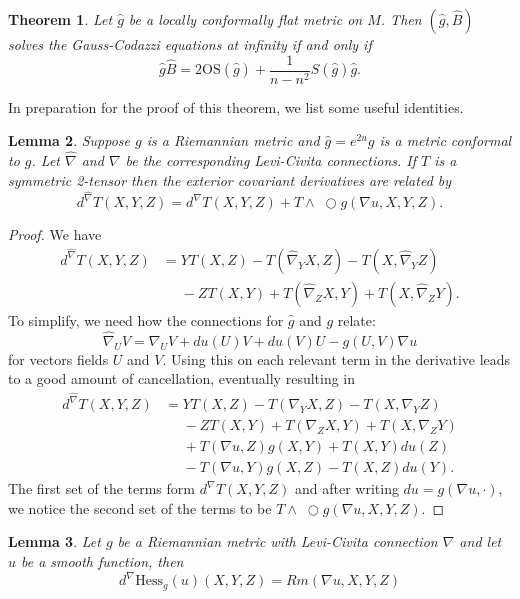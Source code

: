 \documentclass{amsart}
\newcommand{\wtimes}{\wedge \!\!\!\!\!\!\!\!\;\bigcirc}
\newtheorem{thm}{Theorem}[section]
\newtheorem{lem}[thm]{Lemma}
\begin{document}
\begin{thm}
\label{MainThm}
Let $\hat{g}$ be a locally conformally flat metric on $M$. Then $(\hat{g},\hat{B})$ solves the Gauss-Codazzi equations at infinity if and only if 
\[
\hat{g} \hat{B} = 2\mathrm{OS}(\hat{g}) + \frac{1}{n-n^2}S(\hat{g})\hat{g}.
\]
\end{thm}

In preparation for the proof of this theorem, we list some useful identities. 

\begin{lem}
\label{dRel}
Suppose $g$ is a Riemannian metric and $\hat{g} = e^{2u}g$ is a metric conformal to $g$. Let $\hat{\nabla}$ and $\nabla$ be the corresponding Levi-Civita connections. 
If $T$ is a symmetric 2-tensor then the exterior covariant derivatives are related by 
\[
d^{\hat{\nabla}} T(X,Y,Z) = d^\nabla T(X,Y,Z) + T \wtimes g (\nabla u ,X,Y,Z).
\]
\end{lem}
\begin{proof}
We have
\begin{align*}
d^{\hat{\nabla}}T(X,Y,Z)
&= YT(X,Z) - T(\hat{\nabla}_YX,Z) - T(X, \hat{\nabla}_YZ) \\
&\phantom{=} - ZT(X,Y) + T(\hat{\nabla}_ZX,Y) + T(X,\hat{\nabla}_ZY).
\end{align*}
To simplify, we need how the connections for $\hat{g}$ and $g$ relate:
\[
\hat{\nabla}_UV = \nabla_UV + du(U)V + du(V)U - g(U,V)\nabla u
\]
for vectors fields $U$ and $V$.
Using this on each relevant term in the derivative leads to a good amount of cancellation, eventually resulting in 
\begin{align*}
d^{\hat{\nabla}}T(X,Y,Z)
&=YT(X,Z) - T(\nabla_YX,Z) - T(X, \nabla_YZ) \\
&\phantom{=} - ZT(X,Y) + T(\nabla_ZX,Y) + T(X,\nabla_ZY) \\
&\phantom{=} + T(\nabla u ,Z)g(X,Y) + T(X,Y)du(Z) \\
&\phantom{=} - T(\nabla u, Y)g(X,Z) - T(X,Z)du(Y).
\end{align*}
The first set of the terms form $d^\nabla T(X,Y,Z)$ and after writing $du = g(\nabla u , \cdot)$, we notice the second set of the terms to be $T\wtimes g(\nabla u ,X,Y,Z)$.
\end{proof}

\begin{lem}
\label{Hess}
Let $g$ be a Riemannian metric with Levi-Civita connection $\nabla$ and let $u$ be a smooth function, then
\[
d^\nabla \mathrm{Hess}_g(u) (X,Y,Z) = Rm(\nabla u, X, Y, Z)
\]
\end{lem}
\end{document}
